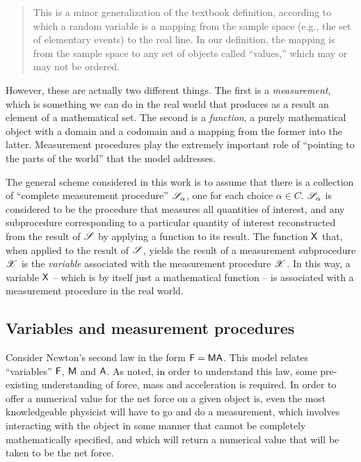 \begin{quote}
This is a minor generalization of the textbook definition, according to which a random variable is a mapping from the sample space (e.g., the set of elementary events) to the real line. In our definition, the mapping is from the sample space to any set of objects called ``values,'' which may or may not be ordered.
\end{quote}

However, these are actually two different things. The first is a \emph{measurement}, which is something we can do in the real world that produces as a result an element of a mathematical set. The second is a \emph{function}, a purely mathematical object with a domain and a codomain and a mapping from the former into the latter. Measurement procedures play the extremely important role of ``pointing to the parts of the world'' that the model addresses.

The general scheme considered in this work is to assume that there is a collection of  ``complete measurement procedure'' $\mathscr{S}_\alpha$, one for each choice $\alpha\in C$. $\mathscr{S}_\alpha$ is considered to be the procedure that measures all quantities of interest, and any subprocedure corresponding to a particular quantity of interest reconstructed from the result of $\mathscr{S}$ by applying a function to its result. The function $\mathsf{X}$ that, when applied to the result of $\mathscr{S}$, yields the result of a measurement subprocedure $\mathscr{X}$ is the \emph{variable} associated with the measurement procedure $\mathscr{X}$. In this way, a variable $\mathsf{X}$ -- which is by itself just a mathematical function -- is associated with a measurement procedure in the real world.

\subsection{Variables and measurement procedures}

Consider Newton's second law in the form $\mathsf{F}=\mathsf{MA}$. This model relates ``variables'' $\mathsf{F}$, $\mathsf{M}$ and $\mathsf{A}$. As \citet{feynman_feynman_1979} noted, in order to understand this law, some pre-existing understanding of force, mass and acceleration is required. In order to offer a numerical value for the net force on a given object is, even the most knowledgeable physicist will have to go and do a measurement, which involves interacting with the object in some manner that cannot be completely mathematically specified, and which will return a numerical value that will be taken to be the net force.

